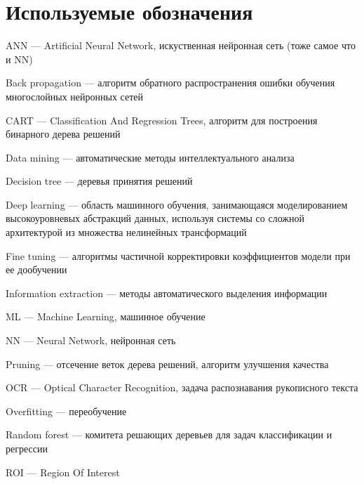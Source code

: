 \documentclass[a4paper,14pt]{extarticle} %
\begin{document}
\newpage
\section*{Используемые обозначения}
ANN --- Artificial Neural Network, искуственная нейронная сеть (тоже самое что и NN)

\noindent Back propagation --- алгоритм обратного распространения ошибки обучения многослойных нейронных сетей 

\noindent CART --- Classification And Regression Trees, алгоритм  для построения бинарного дерева решений

\noindent Data mining --- автоматические методы интеллектуального анализа

\noindent Decision tree --- деревья принятия решений

\noindent Deep learning --- область машинного обучения, занимающаяся моделированием высокоуровневых абстракций данных, используя системы со сложной архитектурой из множества нелинейных трансформаций

\noindent Fine tuning --- алгоритмы частичной корректировки коэффициентов модели при ее дообучении

\noindent Information extraction --- методы автоматического выделения информации

\noindent ML --- Machine Learning, машинное обучение

\noindent NN --- Neural Network, нейронная сеть

\noindent Pruning --- отсечение веток дерева решений, алгоритм улучшения качества

\noindent OCR --- Optical Character Recognition, задача распознавания рукописного текста

\noindent Overfitting --- переобучение 

\noindent Random forest --- комитета решающих деревьев для задач классификации и регрессии

\noindent ROI --- Region Of Interest 

\newpage
\begin{flushleft}
\end{flushleft}
\end{document}
